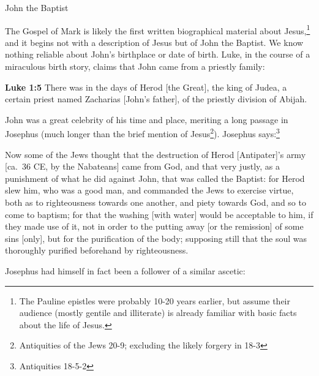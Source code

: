 \documentclass[10pt,twoside]{article} %
\newcommand{\quotesize}{\normalsize{}}
\newcommand{\comm}[1]{\begingroup \color{black!50} #1\endgroup}
\newenvironment{quotetext}{\begingroup\quotesize}{\endgroup}
\newcommand{\intex}[1]{\index[texts]{#1}}
\newcommand{\bible}[2]{\begin{quotetext}\textbf{#1}\intex{#1} #2\end{quotetext}}
\newcommand{\luke}[2]{\bible{Luke #1}{#2}}
\begin{document}
\begin{section}{John the Baptist}

\comm{The Gospel of Mark is likely the first written biographical material about Jesus,\footnote{The Pauline epistles were probably 10-20 years
earlier, but assume their audience (mostly gentile and illiterate) is already familiar with basic facts about the life of Jesus.}
and it begins not with a description of Jesus but of John the Baptist.
We know nothing reliable about John's birthplace or date of birth. Luke, in the course of a miraculous birth story, claims that
John came from a priestly family:}

\luke{1:5}{There was in the days of Herod [the Great], the king of Judea, a certain priest named Zacharias [John's father], of the priestly division of Abijah.}

\comm{
John was a great celebrity of his time and place, meriting a long passage in
Josephus (much longer than the brief mention of Jesus\footnote{Antiquities of the Jews 20-9;
excluding the likely forgery in 18-3}). 
Josephus says:\footnote{Antiquities 18-5-2} %
}

\begin{quotetext}\label{josephus-baptism}
Now some of the Jews thought that the destruction of Herod [Antipater]'s army [ca.~36 CE, by the Nabateans] came
from God, and that very justly, as a punishment of what he did against
John, that was called the Baptist: for Herod slew him, who was a good
man, and commanded the Jews to exercise virtue, both as to
righteousness towards one another, and piety towards God, and so to
come to baptism; for that the washing [with water] would be acceptable
to him, if they made use of it, not in order to the putting away [or
the remission] of some sins [only], but for the purification of the
body; supposing still that the soul was thoroughly purified beforehand
by righteousness.
\end{quotetext}

\comm{
Josephus had himself in fact been a follower of a similar ascetic:
}


\end{section}
\end{document}
